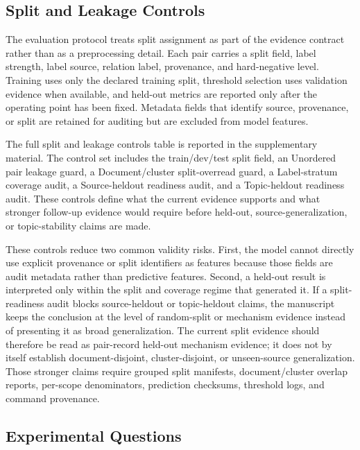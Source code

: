\documentclass[preprint,12pt]{elsarticle}
\begin{document}
\subsection{Split and Leakage Controls}

The evaluation protocol treats split assignment as part of the evidence contract rather than as a preprocessing detail. Each pair carries a split field, label strength, label source, relation label, provenance, and hard-negative level. Training uses only the declared training split, threshold selection uses validation evidence when available, and held-out metrics are reported only after the operating point has been fixed. Metadata fields that identify source, provenance, or split are retained for auditing but are excluded from model features.

The full split and leakage controls table is reported in the supplementary material. The control set includes the train/dev/test split field, an Unordered pair leakage guard, a Document/cluster split-overread guard, a Label-stratum coverage audit, a Source-heldout readiness audit, and a Topic-heldout readiness audit. These controls define what the current evidence supports and what stronger follow-up evidence would require before held-out, source-generalization, or topic-stability claims are made.

These controls reduce two common validity risks. First, the model cannot directly use explicit provenance or split identifiers as features because those fields are audit metadata rather than predictive features. Second, a held-out result is interpreted only within the split and coverage regime that generated it. If a split-readiness audit blocks source-heldout or topic-heldout claims, the manuscript keeps the conclusion at the level of random-split or mechanism evidence instead of presenting it as broad generalization. The current split evidence should therefore be read as pair-record held-out mechanism evidence; it does not by itself establish document-disjoint, cluster-disjoint, or unseen-source generalization. Those stronger claims require grouped split manifests, document/cluster overlap reports, per-scope denominators, prediction checksums, threshold logs, and command provenance.

\subsection{Experimental Questions}
\end{document}
